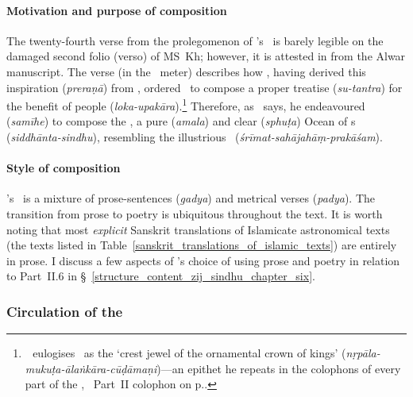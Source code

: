 \paragraph{Motivation and purpose of composition}\label{motivation_purpose_of_siddhantasindhu} 
The twenty-fourth verse from the prolegomenon of \Nityananda's \Siddhantasindhu\ is barely legible on the damaged second folio (verso) of MS~Kh; however, it is attested in \textcite[231]{PetersonCatalogue} from the Alwar manuscript. The verse (in the \sardulavikridita\ meter) describes how \AsafKhanshort, having derived this inspiration (\textit{preraṇā}) from \Shahjahan, ordered \Nityananda\ to compose a proper treatise (\textit{su-tantra}) for the benefit of people (\textit{loka-upakāra}).\footnote{\,\Nityananda\ eulogises \Shahjahan\ as the `crest jewel of the ornamental crown of kings' (\textit{nṛpāla-mukuṭa-ālaṅkāra-cūḍāmaṇi})---an epithet he repeats in the colophons of every part of the \Siddhantasindhu, \eg \vid\ Part~II colophon on p.\thinspace \pageref{partII_colophon_sanskrit}.} Therefore, as \Nityananda\ says, he endeavoured (\textit{samīhe}) to compose the \Siddhantasindhu, a pure (\textit{amala}) and clear (\textit{sphuṭa}) Ocean of \Siddhanta s (\textit{siddhānta-sindhu}), resembling the illustrious \ZijiShahJahani\ (\textit{śrīmat-sahājahāṃ-prakāśam}). 


\paragraph{Style of composition} \label{prose_poetry_mixed_form}   
\Nityananda's \Siddhantasindhu\ is a mixture of prose-sentences (\textit{gadya}) and metrical verses (\textit{padya}). The transition from prose to poetry is ubiquitous throughout the text. It is worth noting that most \textit{explicit} Sanskrit translations of Islamicate astronomical texts (\eg the texts listed in Table~\ref{sanskrit_translations_of_islamic_texts}) are entirely in prose. I discuss a few aspects of \Nityananda's choice of using prose and poetry in relation to Part~II.6 in \S~\ref{structure_content_zij_sindhu_chapter_six}.
    
\subsubsection{Circulation of the \Siddhantasindhu} \label{circualtion_siddhantasindhu}

